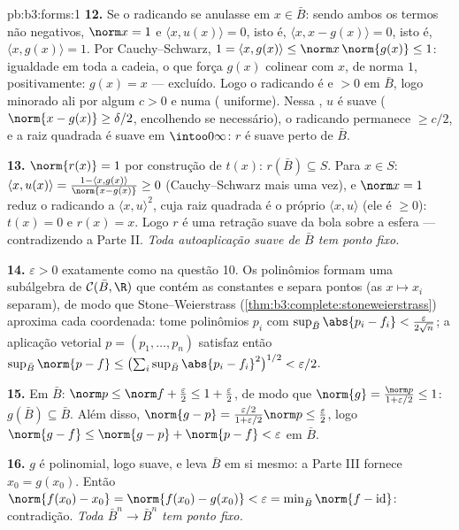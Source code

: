 \begin{solution}{pb:b3:forms:1}
\textbf{12.} Se o radicando se anulasse em $x \in \bar B$:
sendo ambos os termos não negativos, $\norm x = 1$ e
$\langle x, u(x)\rangle = 0$, isto é, $\langle x, x -
g(x)\rangle = 0$, isto é, $\langle x, g(x)\rangle = 1$. Por
Cauchy--Schwarz, $1 = \langle x, g(x)\rangle \leq
\norm x\,\norm{g(x)} \leq 1$: igualdade em toda a cadeia, o que
força $g(x)$ colinear com $x$, de norma $1$, positivamente:
$g(x) = x$ --- excluído. Logo o radicando é  e
$> 0$ em $\bar B$, logo minorado ali por algum $c > 0$
e numa  ( uniforme). Nessa
, $u$ é suave ($\norm{x - g(x)} \geq
\delta/2$, encolhendo se necessário), o radicando permanece $\geq
c/2$, e a raiz quadrada é suave em $\intoo0\infty$: $r$
é suave perto de $\bar B$.

\textbf{13.} $\norm{r(x)} = 1$ por construção de $t(x)$:
$r(\bar B) \subseteq S$. Para $x \in S$: $\langle x,
u(x)\rangle = \frac{1 - \langle x, g(x)\rangle}{\norm{x -
g(x)}} \geq 0$ (Cauchy--Schwarz mais uma vez), e $\norm x =
1$ reduz o radicando a $\langle x, u\rangle^2$, cuja
raiz quadrada é o próprio $\langle x, u\rangle$ (ele é $\geq
0$): $t(x) = 0$ e $r(x) = x$. Logo $r$ é uma retração suave
da bola sobre a esfera --- contradizendo
a Parte II. \emph{Toda autoaplicação suave de $\bar B$ tem
ponto fixo.}

\textbf{14.} $\varepsilon > 0$ exatamente como na questão 10.
Os polinômios formam uma subálgebra de $\mathcal C(\bar B,
\R)$ que contém as constantes e separa pontos (as $x
\mapsto x_i$ separam), de modo que Stone--Weierstrass
(\cref{thm:b3:complete:stoneweierstrass}) aproxima cada
coordenada: tome polinômios $p_i$ com $\sup_{\bar
B}\abs{p_i - f_i} < \frac{\varepsilon}{2\sqrt n}$; a
aplicação vetorial $p = (p_1, \dots, p_n)$ satisfaz então
$\sup_{\bar B}\norm{p - f} \leq
\bigl(\sum_i\sup_{\bar B}\abs{p_i - f_i}^2\bigr)^{1/2} <
\varepsilon/2$.

\textbf{15.} Em $\bar B$: $\norm p \leq \norm f +
\frac\varepsilon2 \leq 1 + \frac\varepsilon2$, de modo que
$\norm{g} = \frac{\norm p}{1 + \varepsilon/2} \leq 1$:
$g(\bar B) \subseteq \bar B$. Além disso, $\norm{g - p} =
\frac{\varepsilon/2}{1 + \varepsilon/2}\norm p \leq
\frac\varepsilon2$, logo $\norm{g - f} \leq \norm{g - p} +
\norm{p - f} < \varepsilon$ em $\bar B$.

\textbf{16.} $g$ é polinomial, logo suave, e leva
$\bar B$ em si mesmo: a Parte III fornece $x_0 = g(x_0)$.
Então $\norm{f(x_0) - x_0} = \norm{f(x_0) - g(x_0)} <
\varepsilon = \min_{\bar B}\norm{f - \operatorname{id}}$:
contradição. \emph{Toda  $\bar B^n \to
\bar B^n$ tem ponto fixo.}


\end{solution}
